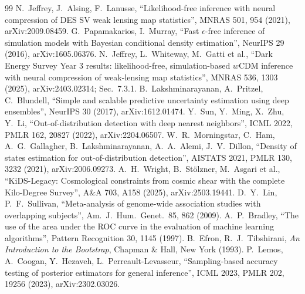 \documentclass[9pt,twocolumn]{extarticle}
\begin{document}
\begin{thebibliography}{99}\footnotesize\setlength{\itemsep}{0pt}
 N.~Jeffrey, J.~Alsing, F.~Lanusse, ``Likelihood-free inference with neural compression of DES SV weak lensing map statistics'', MNRAS 501, 954 (2021), arXiv:2009.08459.
 G.~Papamakarios, I.~Murray, ``Fast $\epsilon$-free inference of simulation models with Bayesian conditional density estimation'', NeurIPS 29 (2016), arXiv:1605.06376.
 N.~Jeffrey, L.~Whiteway, M.~Gatti et al., ``Dark Energy Survey Year 3 results: likelihood-free, simulation-based $w$CDM inference with neural compression of weak-lensing map statistics'', MNRAS 536, 1303 (2025), arXiv:2403.02314; Sec.~7.3.1.
 B.~Lakshminarayanan, A.~Pritzel, C.~Blundell, ``Simple and scalable predictive uncertainty estimation using deep ensembles'', NeurIPS 30 (2017), arXiv:1612.01474.
 Y.~Sun, Y.~Ming, X.~Zhu, Y.~Li, ``Out-of-distribution detection with deep nearest neighbors'', ICML 2022, PMLR 162, 20827 (2022), arXiv:2204.06507.
 W.~R.~Morningstar, C.~Ham, A.~G.~Gallagher, B.~Lakshminarayanan, A.~A.~Alemi, J.~V.~Dillon, ``Density of states estimation for out-of-distribution detection'', AISTATS 2021, PMLR 130, 3232 (2021), arXiv:2006.09273.
 A.~H.~Wright, B.~St\"olzner, M.~Asgari et al., ``KiDS-Legacy: Cosmological constraints from cosmic shear with the complete Kilo-Degree Survey'', A\&A 703, A158 (2025), arXiv:2503.19441.
 D.~Y.~Lin, P.~F.~Sullivan, ``Meta-analysis of genome-wide association studies with overlapping subjects'', Am.\ J.\ Hum.\ Genet.\ 85, 862 (2009).
 A.~P.~Bradley, ``The use of the area under the ROC curve in the evaluation of machine learning algorithms'', Pattern Recognition 30, 1145 (1997).
 B.~Efron, R.~J.~Tibshirani, \emph{An Introduction to the Bootstrap}, Chapman \& Hall, New York (1993).
 P.~Lemos, A.~Coogan, Y.~Hezaveh, L.~Perreault-Levasseur, ``Sampling-based accuracy testing of posterior estimators for general inference'', ICML 2023, PMLR 202, 19256 (2023), arXiv:2302.03026.
\end{thebibliography}
\end{document}

